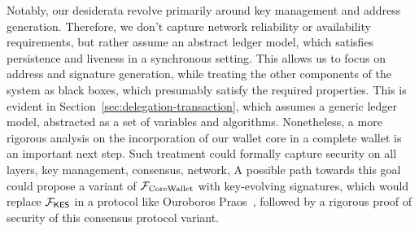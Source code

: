 Notably, our desiderata revolve primarily around key management and address
generation. Therefore, we don't capture network reliability or availability
requirements, but rather assume an abstract ledger model, which satisfies
persistence and liveness in a synchronous setting. This allows us to focus on
address and signature generation, while treating the other components of the
system as black boxes, which presumably satisfy the required properties. This
is evident in Section~\ref{sec:delegation-transaction}, which assumes a generic
ledger model, abstracted as a set of variables and algorithms. Nonetheless, a
more rigorous analysis on the incorporation of our wallet core in a complete
wallet is an important next step. Such treatment could formally capture
security on all layers, \ie key management, consensus, network, \etc A possible
path towards this goal could propose a variant of $\mathcal{F}_\mathrm{CoreWallet}$ with key-evolving
signatures, which would replace $\mathcal{F}_{\mathsf{KES}}$ in a protocol like
Ouroboros Praos~\cite{EC:DGKR18}, followed by a rigorous proof of security of
this consensus protocol variant.
